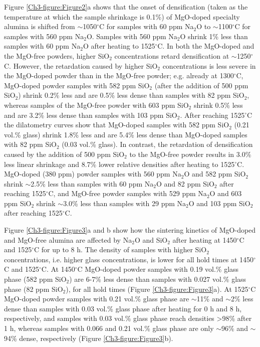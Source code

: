 Figure \ref{Ch3-figure:Figure2}a shows that the onset of densification (taken as the temperature at which the sample shrinkage is 0.1\%) of MgO-doped specialty alumina is shifted from $\sim$1050$^{\circ}$C for samples with 60 ppm Na$_{2}$O to $\sim$1100$^{\circ}$C for samples with 560 ppm Na$_{2}$O. Samples with 560 ppm Na$_{2}$O shrink 1\% less than samples with 60 ppm Na$_{2}$O after heating to 1525$^{\circ}$C. In both the MgO-doped and the MgO-free powders, higher SiO$_{2}$ concentrations retard densification at $\sim$1250$^{\circ}$C. However, the retardation caused by higher SiO$_{2}$ concentrations is less severe in the MgO-doped powder than in the MgO-free powder; e.g. already at 1300$^{\circ}$C, MgO-doped powder samples with 582 ppm SiO$_{2}$ (after the addition of 500 ppm SiO$_{2}$) shrink 0.2\% less and are 0.5\% less dense than samples with 82 ppm SiO$_{2}$, whereas samples of the MgO-free powder with 603 ppm SiO$_{2}$ shrink 0.5\% less and are 3.2\% less dense than samples with 103 ppm SiO$_{2}$. After reaching 1525$^{\circ}$C the dilatometry curves show that MgO-doped samples with 582 ppm SiO$_{2}$ (0.21 vol.\% glass) shrink 1.8\% less and are 5.4\% less dense than MgO-doped samples with 82 ppm SiO$_{2}$ (0.03 vol.\% glass). In contrast, the retardation of densification caused by the addition of 500 ppm SiO$_{2}$ to the MgO-free powder results in 3.0\% less linear shrinkage and 8.7\% lower relative densities after heating to 1525$^{\circ}$C. MgO-doped (380 ppm) powder samples with 560 ppm Na$_{2}$O and 582 ppm SiO$_{2}$ shrink $\sim$2.5\% less than samples with 60 ppm Na$_{2}$O and 82 ppm SiO$_{2}$ after reaching 1525$^{\circ}$C, and MgO-free powder samples with 529 ppm Na$_{2}$O and 603 ppm SiO$_{2}$ shrink $\sim$3.0\% less than samples with 29 ppm Na$_{2}$O and 103 ppm SiO$_{2}$ after reaching 1525$^{\circ}$C.

Figure \ref{Ch3-figure:Figure3}a and b show how the sintering kinetics of MgO-doped and MgO-free alumina are affected by Na$_{2}$O and SiO$_{2}$ after heating at 1450$^{\circ}$C and 1525$^{\circ}$C for up to 8 h. The density of samples with higher SiO$_{2}$ concentrations, i.e. higher glass concentrations, is lower for all hold times at 1450$^{\circ}$C and 1525$^{\circ}$C. At 1450$^{\circ}$C MgO-doped powder samples with 0.19 vol.\% glass phase (582 ppm SiO$_{2}$) are 6-7\% less dense than samples with 0.027 vol.\% glass phase (82 ppm SiO$_{2}$), for all hold times (Figure \ref{Ch3-figure:Figure3}a). At 1525$^{\circ}$C MgO-doped powder samples with 0.21 vol.\% glass phase are $\sim$11\% and $\sim$2\% less dense than samples with 0.03 vol.\% glass phase after heating for 0 h and 8 h, respectively, and samples with 0.03 vol.\% glass phase reach densities >98\% after 1 h, whereas samples with 0.066 and 0.21 vol.\% glass phase are only $\sim$96\% and $\sim$94\% dense, respectively (Figure \ref{Ch3-figure:Figure3}b). 

